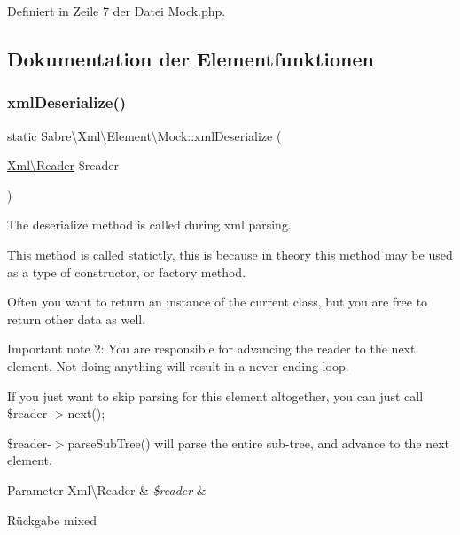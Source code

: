 Definiert in Zeile 7 der Datei Mock.\+php.



\subsection{Dokumentation der Elementfunktionen}
\mbox{\label{class_sabre_1_1_xml_1_1_element_1_1_mock_ae0a1963d550eb38ce5b09f7adee9e9e6}} 
\subsubsection{\texorpdfstring{xml\+Deserialize()}{xmlDeserialize()}}
{\footnotesize\ttfamily static Sabre\textbackslash{}\+Xml\textbackslash{}\+Element\textbackslash{}\+Mock\+::xml\+Deserialize (\begin{DoxyParamCaption}\item[{\mbox{\hyperlink{class_sabre_1_1_xml_1_1_reader}{Xml\textbackslash{}\+Reader}}}]{\$reader }\end{DoxyParamCaption})\hspace{0.3cm}{\ttfamily [static]}}

The deserialize method is called during xml parsing.

This method is called statictly, this is because in theory this method may be used as a type of constructor, or factory method.

Often you want to return an instance of the current class, but you are free to return other data as well.

Important note 2\+: You are responsible for advancing the reader to the next element. Not doing anything will result in a never-\/ending loop.

If you just want to skip parsing for this element altogether, you can just call \$reader-\/$>$next();

\$reader-\/$>$parse\+Sub\+Tree() will parse the entire sub-\/tree, and advance to the next element.


\begin{DoxyParams}[1]{Parameter}
Xml\textbackslash{}\+Reader & {\em \$reader} & \\
\hline
\end{DoxyParams}
\begin{DoxyReturn}{Rückgabe}
mixed 
\end{DoxyReturn}


